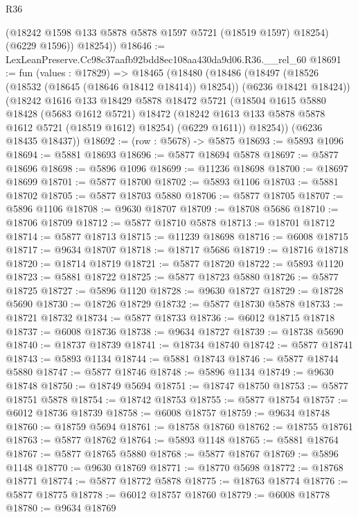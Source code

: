 \begin{lexlean}{R36}
\begin{coremodule}
          (@18242 @1598 @133 @5878 @5878 @1597 @5721 (@18519 @1597) @18254)
          (@6229 @1596))
        @18254))
@18646 := LexLeanPreserve.Cc98c37aafb92bdd8ec108aa430da9d06.R36.__rel_60
@18691 := fun (values : @17829) =>
  @18465
    (@18480
      (@18486
        (@18497 (@18526 (@18532 (@18645 (@18646 @18412 @18414)) @18254)) (@6236 @18421 @18424))
        (@18242
          @1616
          @133
          @18429
          @5878
          @18472
          @5721
          (@18504
            @1615
            @5880
            @18428
            (@5683 @1612 @5721)
            @18472
            (@18242 @1613 @133 @5878 @5878 @1612 @5721 (@18519 @1612) @18254)
            (@6229 @1611))
          @18254))
      (@6236 @18435 @18437))
@18692 := (row : @5678) -> @5875
@18693 := @5893 @1096
@18694 := @5881 @18693
@18696 := @5877 @18694 @5878
@18697 := @5877 @18696
@18698 := @5896 @1096
@18699 := @11236 @18698
@18700 := @18697 @18699
@18701 := @5877 @18700
@18702 := @5893 @1106
@18703 := @5881 @18702
@18705 := @5877 @18703 @5880
@18706 := @5877 @18705
@18707 := @5896 @1106
@18708 := @9630 @18707
@18709 := @18708 @5686
@18710 := @18706 @18709
@18712 := @5877 @18710 @5878
@18713 := @18701 @18712
@18714 := @5877 @18713
@18715 := @11239 @18698
@18716 := @6008 @18715
@18717 := @9634 @18707
@18718 := @18717 @5686
@18719 := @18716 @18718
@18720 := @18714 @18719
@18721 := @5877 @18720
@18722 := @5893 @1120
@18723 := @5881 @18722
@18725 := @5877 @18723 @5880
@18726 := @5877 @18725
@18727 := @5896 @1120
@18728 := @9630 @18727
@18729 := @18728 @5690
@18730 := @18726 @18729
@18732 := @5877 @18730 @5878
@18733 := @18721 @18732
@18734 := @5877 @18733
@18736 := @6012 @18715 @18718
@18737 := @6008 @18736
@18738 := @9634 @18727
@18739 := @18738 @5690
@18740 := @18737 @18739
@18741 := @18734 @18740
@18742 := @5877 @18741
@18743 := @5893 @1134
@18744 := @5881 @18743
@18746 := @5877 @18744 @5880
@18747 := @5877 @18746
@18748 := @5896 @1134
@18749 := @9630 @18748
@18750 := @18749 @5694
@18751 := @18747 @18750
@18753 := @5877 @18751 @5878
@18754 := @18742 @18753
@18755 := @5877 @18754
@18757 := @6012 @18736 @18739
@18758 := @6008 @18757
@18759 := @9634 @18748
@18760 := @18759 @5694
@18761 := @18758 @18760
@18762 := @18755 @18761
@18763 := @5877 @18762
@18764 := @5893 @1148
@18765 := @5881 @18764
@18767 := @5877 @18765 @5880
@18768 := @5877 @18767
@18769 := @5896 @1148
@18770 := @9630 @18769
@18771 := @18770 @5698
@18772 := @18768 @18771
@18774 := @5877 @18772 @5878
@18775 := @18763 @18774
@18776 := @5877 @18775
@18778 := @6012 @18757 @18760
@18779 := @6008 @18778
@18780 := @9634 @18769

\end{coremodule}
\end{lexlean}
